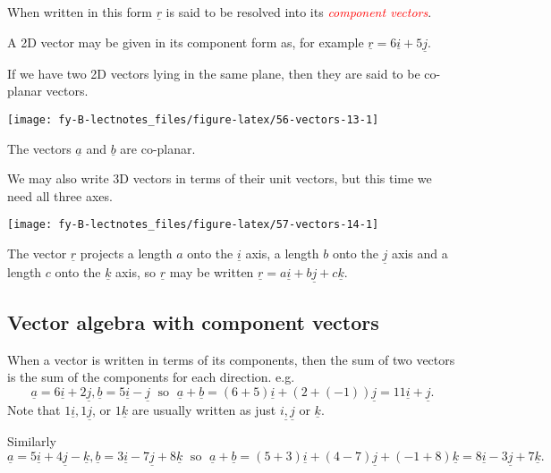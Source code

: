 \documentclass[
  11pt,
  oneside]{book}
\newcommand{\slide}{}
\theoremstyle{definition}
\theoremstyle{definition}
\theoremstyle{definition}
\theoremstyle{definition}
\theoremstyle{remark}
\begin{document}
When written in this form \(\underline r\) is said to be resolved into its \textcolor{red}{\em component vectors}.

\slide

A 2D vector may be given in its component form as, for example \(\underline r = 6\underline i + 5\underline j\).

If we have two 2D vectors lying in the same plane, then they are said to be co-planar vectors.

\begin{center}\texttt{[image: fy-B-lectnotes\_files/figure-latex/56-vectors-13-1]} \end{center}

The vectors \(\underline a\) and \(\underline b\) are co-planar.

\slide

We may also write 3D vectors in terms of their unit vectors, but this time we need all three axes.

\begin{center}\texttt{[image: fy-B-lectnotes\_files/figure-latex/57-vectors-14-1]} \end{center}

The vector \(\underline r\) projects a length \(a\) onto the \(\underline i\) axis, a length \(b\) onto the \(\underline j\) axis and a length \(c\) onto the \(\underline k\) axis, so \(\underline r\) may be written \(\underline r = a\underline i + b\underline j + c\underline k\).

\slide

\subsection{Vector algebra with component vectors}\label{vector-algebra-with-component-vectors}

When a vector is written in terms of its components, then the sum of two vectors is the sum of the components for each direction. e.g.
\[
\underline a = 6\underline i + 2\underline j, \underline b = 5\underline i - \underline j\;\text{ so }\;\underline a + \underline b = (6 + 5)\underline i + (2 + (-1))\underline j = 11\underline i + \underline j.
\]
Note that \(1\underline i, 1\underline j\), or \(1\underline k\) are usually written as just \(i\underline , \underline j\) or \(\underline k\).

Similarly
\[
\underline a = 5\underline i + 4\underline j - \underline k, \underline b = 3\underline i - 7\underline j + 8\underline k\;\text{ so }\; \underline a + \underline b = (5+3)\underline i + (4 - 7)\underline j + (-1 + 8)\underline k = 8\underline i -3\underline j + 7\underline k.
\]
\end{document}
